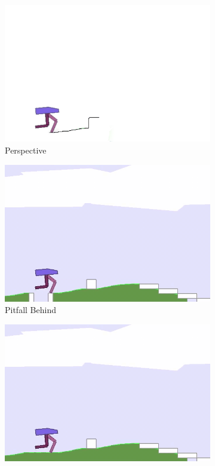 \documentclass[a4paper, 12pt]{article} %
\begin{document}
\begin{figure}
	\begin{subfigure}{.32\textwidth}
		\centering
		\includegraphics[width=0.99\linewidth]{figures/bipedal/po/lidarcover.png}
		\caption{Perspective}
		\label{fig:lidar_cover}
	\end{subfigure}
	\begin{subfigure}{.32\textwidth}
		\centering
		\includegraphics[width=0.99\linewidth]{figures/bipedal/po/pitfall_behind.png}
		\caption{Pitfall Behind}
		\label{fig:pitfall_behind}
	\end{subfigure}
	\begin{subfigure}{.32\textwidth}
		\centering
		\includegraphics[width=0.99\linewidth]{figures/bipedal/po/no_pitfall_behind.png}

\end{subfigure}
\end{figure}
\end{document}
